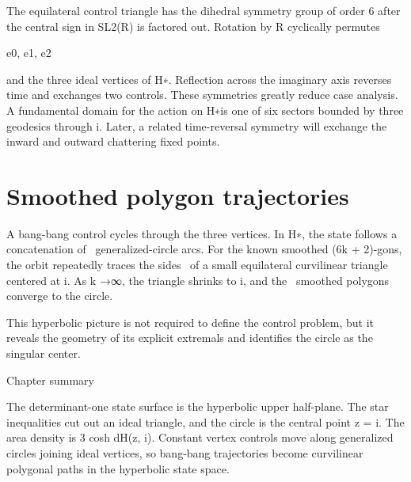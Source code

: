 The equilateral control triangle has the dihedral symmetry group of order 6 after the central sign in SL2(R) is factored out. Rotation by R cyclically permutes


e0, e1, e2


and the three ideal vertices of H∗. Reflection across the imaginary axis reverses time and exchanges two controls. These symmetries greatly reduce case analysis. A fundamental domain for the action on H∗is one of six sectors bounded by three geodesics through i. Later, a related time-reversal symmetry will exchange the inward and outward chattering fixed points.


\section{Smoothed polygon trajectories}

\begin{displaytext}
A bang-bang control cycles through the three vertices. In H∗, the state follows a concatenation of \
generalized-circle arcs. For the known smoothed (6k + 2)-gons, the orbit repeatedly traces the sides \
of a small equilateral curvilinear triangle centered at i. As k →∞, the triangle shrinks to i, and the \
smoothed polygons converge to the circle.
\end{displaytext}

This hyperbolic picture is not required to define the control problem, but it reveals the geometry of its explicit extremals and identifies the circle as the singular center.


\begin{insightbox}{Chapter summary}
\end{insightbox}

The determinant-one state surface is the hyperbolic upper half-plane. The star inequalities cut out an ideal triangle, and the circle is the central point z = i. The area density is 3 cosh dH(z, i). Constant vertex controls move along generalized circles joining ideal vertices, so bang-bang trajectories become curvilinear polygonal paths in the hyperbolic state space.

